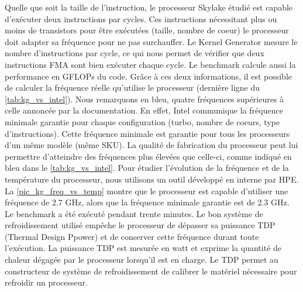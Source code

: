     
    Quelle que soit la taille de l'instruction, le processeur Skylake étudié est capable d'exécuter deux instructions par cycles. Ces instructions nécessitant plus ou moins de transistors pour être exécutées (taille, nombre de coeur) le processeur doit adapter sa fréquence pour ne pas surchauffer.  Le Kernel Generator mesure le nombre d'instructions par cycle, ce qui nous permet de vérifier que deux instructions FMA sont bien exécuter chaque cycle. Le benchmark calcule aussi la performance en GFLOPs du code. Grâce à ces deux informations, il est possible de calculer la fréquence réelle qu'utilise le processeur (dernière ligne du  \autoref{tab:kg_vs_intel}). Nous remarquons en bleu, quatre fréquences supérieures à celle annoncée par la documentation. En effet, Intel communique la fréquence minimale garantie pour chaque configuration (turbo, nombre de coeurs, type d'instructions). Cette fréquence minimale est garantie pour tous les processeurs d'un même modèle (même SKU). La qualité de fabrication du processeur peut lui permettre d'atteindre des fréquences plus élevées que celle-ci, comme indiqué en bleu dans le \autoref{tab:kg_vs_intel}. Pour étudier l'évolution de la fréquence et de la température du processeur, nous utilisons un outil développé en interne par HPE. La \autoref{pic_kg_freq_vs_temp} montre que le processeur est capable d'utiliser une fréquence de 2.7 GHz, alors que la fréquence minimale garantie est de 2.3 GHz. Le benchmark a été exécuté pendant trente minutes. Le bon système de refroidissement utilisé empêche le processeur de dépasser sa puissance TDP (Thermal Design Ppower) et de conserver cette fréquence durant toute l'exécution. La puissance TDP est mesurée en watt et exprime la quantité de chaleur dégagée par le processeur lorsqu'il est en charge. Le TDP permet au constructeur de système de refroidissement de calibrer le matériel nécessaire pour refroidir un processeur.  
    

